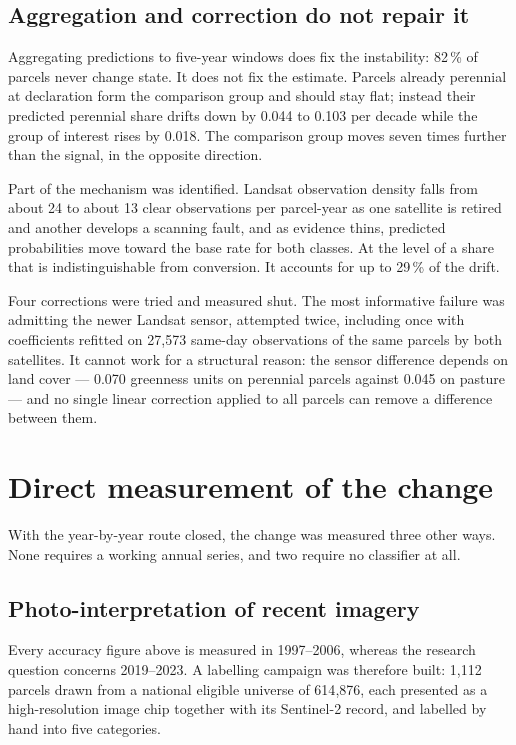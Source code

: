 \documentclass[11pt,a4paper]{article}
\begin{document}
\subsection{Aggregation and correction do not repair it}

Aggregating predictions to five-year windows does fix the instability: 82\,\% of parcels never
change state. It does not fix the estimate. Parcels already perennial at declaration form the
comparison group and should stay flat; instead their predicted perennial share drifts down by
0.044 to 0.103 per decade while the group of interest rises by 0.018. The comparison group moves
seven times further than the signal, in the opposite direction.

Part of the mechanism was identified. Landsat observation density falls from about 24 to about 13
clear observations per parcel-year as one satellite is retired and another develops a scanning
fault, and as evidence thins, predicted probabilities move toward the base rate for both classes.
At the level of a share that is indistinguishable from conversion. It accounts for up to 29\,\%
of the drift.

Four corrections were tried and measured shut. The most informative failure was admitting the
newer Landsat sensor, attempted twice, including once with coefficients refitted on 27{,}573
same-day observations of the same parcels by both satellites. It cannot work for a structural
reason: the sensor difference depends on land cover --- 0.070 greenness units on perennial
parcels against 0.045 on pasture --- and no single linear correction applied to all parcels can
remove a difference between them.

\section{Direct measurement of the change}
\label{sec:census}

With the year-by-year route closed, the change was measured three other ways. None requires a
working annual series, and two require no classifier at all.

\subsection{Photo-interpretation of recent imagery}

Every accuracy figure above is measured in 1997--2006, whereas the research question concerns
2019--2023. A labelling campaign was therefore built: 1{,}112 parcels drawn from a national
eligible universe of 614{,}876, each presented as a high-resolution image chip together with its
Sentinel-2 record, and labelled by hand into five categories.
\end{document}

